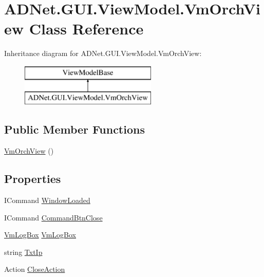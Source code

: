 \hypertarget{class_a_d_net_1_1_g_u_i_1_1_view_model_1_1_vm_orch_view}{}\section{A\+D\+Net.\+G\+U\+I.\+View\+Model.\+Vm\+Orch\+View Class Reference}
\label{class_a_d_net_1_1_g_u_i_1_1_view_model_1_1_vm_orch_view}
Inheritance diagram for A\+D\+Net.\+G\+U\+I.\+View\+Model.\+Vm\+Orch\+View\+:\begin{figure}[H]
\begin{center}
\leavevmode
\includegraphics[height=2.000000cm]{class_a_d_net_1_1_g_u_i_1_1_view_model_1_1_vm_orch_view}
\end{center}
\end{figure}
\subsection*{Public Member Functions}
\begin{DoxyCompactItemize}
\item 
\hyperlink{class_a_d_net_1_1_g_u_i_1_1_view_model_1_1_vm_orch_view_afdbc3e4ec6e40761168e2b8f6b8d99be}{Vm\+Orch\+View} ()
\end{DoxyCompactItemize}
\subsection*{Properties}
\begin{DoxyCompactItemize}
\item 
I\+Command \hyperlink{class_a_d_net_1_1_g_u_i_1_1_view_model_1_1_vm_orch_view_a293d3e1bf546bca40b3ee3bb9b06fe8e}{Window\+Loaded}
\item 
I\+Command \hyperlink{class_a_d_net_1_1_g_u_i_1_1_view_model_1_1_vm_orch_view_ac3fa5e62b4f1d498661924de51de683d}{Command\+Btn\+Close}
\item 
\hyperlink{class_node_net_1_1_g_u_i_1_1_view_model_1_1_vm_log_box}{Vm\+Log\+Box} \hyperlink{class_a_d_net_1_1_g_u_i_1_1_view_model_1_1_vm_orch_view_a955910093134506f2ff1fadbde5f097e}{Vm\+Log\+Box}
\item 
string \hyperlink{class_a_d_net_1_1_g_u_i_1_1_view_model_1_1_vm_orch_view_a7471f9d9f6e3950c4276d2e8828e252b}{Txt\+Ip}
\item 
Action \hyperlink{class_a_d_net_1_1_g_u_i_1_1_view_model_1_1_vm_orch_view_a252bfe712fb8627090774fdea06a3863}{Close\+Action}
\end{DoxyCompactItemize}


